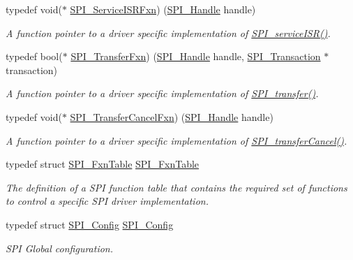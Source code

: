 \begin{DoxyCompactItemize}
typedef void($\ast$ \hyperlink{_s_p_i_8h_aeb15890517783b3b646a36a76dbe2070}{S\+P\+I\+\_\+\+Service\+I\+S\+R\+Fxn}) (\hyperlink{_s_p_i_8h_a728806534c3c3e8675cfbfb7d8e36f13}{S\+P\+I\+\_\+\+Handle} handle)
\begin{DoxyCompactList}\small\item\em A function pointer to a driver specific implementation of \hyperlink{_s_p_i_8h_aa6f1baa732ebbf0aa7cd5c3f7dfd215a}{S\+P\+I\+\_\+service\+I\+S\+R()}. \end{DoxyCompactList}\item 
typedef bool($\ast$ \hyperlink{_s_p_i_8h_a470d264d053b30edb0aaafcafd335c26}{S\+P\+I\+\_\+\+Transfer\+Fxn}) (\hyperlink{_s_p_i_8h_a728806534c3c3e8675cfbfb7d8e36f13}{S\+P\+I\+\_\+\+Handle} handle, \hyperlink{struct_s_p_i___transaction}{S\+P\+I\+\_\+\+Transaction} $\ast$transaction)
\begin{DoxyCompactList}\small\item\em A function pointer to a driver specific implementation of \hyperlink{_s_p_i_8h_a989e17f96b54fcc3dc2cac5f8ac6bdb2}{S\+P\+I\+\_\+transfer()}. \end{DoxyCompactList}\item 
typedef void($\ast$ \hyperlink{_s_p_i_8h_a33f5b214451ac89ea462083eeba0bf8c}{S\+P\+I\+\_\+\+Transfer\+Cancel\+Fxn}) (\hyperlink{_s_p_i_8h_a728806534c3c3e8675cfbfb7d8e36f13}{S\+P\+I\+\_\+\+Handle} handle)
\begin{DoxyCompactList}\small\item\em A function pointer to a driver specific implementation of \hyperlink{_s_p_i_8h_a6819f7761fc3505c4f885653ff8121f0}{S\+P\+I\+\_\+transfer\+Cancel()}. \end{DoxyCompactList}\item 
typedef struct \hyperlink{struct_s_p_i___fxn_table}{S\+P\+I\+\_\+\+Fxn\+Table} \hyperlink{_s_p_i_8h_abfe91bed666eb36f3b3fa54f4b9f84bf}{S\+P\+I\+\_\+\+Fxn\+Table}
\begin{DoxyCompactList}\small\item\em The definition of a S\+P\+I function table that contains the required set of functions to control a specific S\+P\+I driver implementation. \end{DoxyCompactList}\item 
typedef struct \hyperlink{struct_s_p_i___config}{S\+P\+I\+\_\+\+Config} \hyperlink{_s_p_i_8h_ae19802ec6efc91414e46af9b2435b942}{S\+P\+I\+\_\+\+Config}
\begin{DoxyCompactList}\small\item\em S\+P\+I Global configuration. \end{DoxyCompactList}\end{DoxyCompactItemize}
